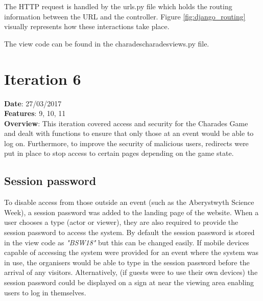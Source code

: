The HTTP request is handled by the urls.py file which holds the routing information between the URL and the controller. Figure \ref{fig:django_routing} visually represents how these interactions take place.

The view code can be found in the \/charades\/charades\/views.py file.

\begin{figure}[h!]
\end{figure}


\newpage

\section{Iteration 6}
\textbf{Date}: 27/03/2017 \\
\textbf{Features}: 9, 10, 11 \\
\textbf{Overview}: This iteration covered access and security for the Charades Game and dealt with functions to ensure that only those at an event would be able to log on. Furthermore, to improve the security of malicious users, redirects were put in place to stop access to certain pages depending on the game state.

\subsection{Session password}
To disable access from those outside an event (such as the Aberystwyth Science Week), a session password was added to the landing page of the website. When a user chooses a type (actor or viewer), they are also required to provide the session password to access the system. By default the session password is stored in the view code as \textit{"BSW18"} but this can be changed easily. If mobile devices capable of accessing the system were provided for an event where the system was in use, the organisers would be able to type in the session password before the arrival of any visitors. Alternatively, (if guests were to use their own devices) the session password could be displayed on a sign at near the viewing area enabling users to log in themselves.

